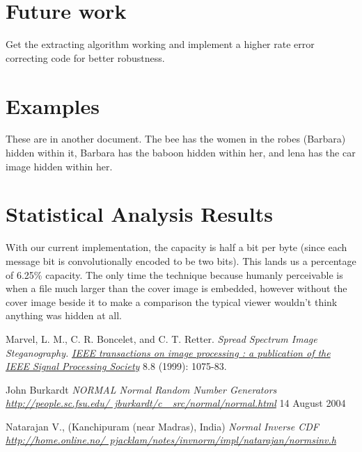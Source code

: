 \documentclass[11pt]{article}
\begin{document}
\section{Future work}
\indent
Get the extracting algorithm working and implement a higher rate error correcting code for better
robustness.

\section{Examples}
\indent
These are in another document. The bee has the women in the robes (Barbara) hidden within it,
Barbara has the baboon hidden within her, and lena has the car image hidden within her.

\section{Statistical Analysis Results}
\indent
With our current implementation, the capacity is half a bit per byte (since each message bit is 
convolutionally encoded to be two bits). This lands us a percentage of 6.25\% capacity. The only
time the technique because humanly perceivable is when a file much larger than the cover image is
embedded, however without the cover image beside it to make a comparison the typical viewer wouldn't
think anything was hidden at all.

\newpage
\begin{thebibliography}{9}

Marvel, L. M., C. R. Boncelet, and C. T. Retter. 
\textit{Spread Spectrum Image Steganography.}
\textit{\underline{IEEE transactions on image processing : a publication of the IEEE Signal Processing Society}}
8.8 (1999): 1075-83.

John Burkardt
\textit{NORMAL Normal Random Number Generators }
\textit{\underline{http://people.sc.fsu.edu/~jburkardt/c\_ src/normal/normal.html}}
14 August 2004

Natarajan V., (Kanchipuram (near Madras), India)
\textit{Normal Inverse CDF}
\textit{\underline{http://home.online.no/~pjacklam/notes/invnorm/impl/natarajan/normsinv.h}}
\end{thebibliography}
\end{document}
